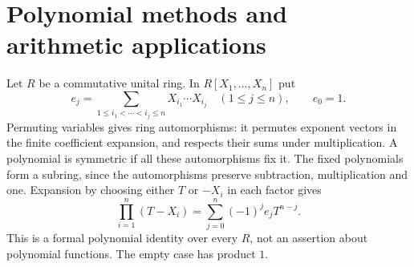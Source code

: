 \chapter{Polynomial methods and arithmetic applications}\label{chap:M07.19}

Let $R$ be a commutative unital ring. In $R[X_1,\ldots,X_n]$ put
\[
 e_j=\sum_{1\le i_1<\cdots<i_j\le n}X_{i_1}\cdots X_{i_j}
 \quad(1\le j\le n),\qquad e_0=1.
\]
Permuting variables gives ring automorphisms: it permutes exponent
vectors in the finite coefficient expansion, and respects their sums
under multiplication. A polynomial is symmetric if all these
automorphisms fix it. The fixed polynomials form a subring, since the
automorphisms preserve subtraction, multiplication and one.
Expansion by choosing either $T$ or $-X_i$ in each factor gives
\begin{equation}\label{eq:symmetric-vieta}
 \prod_{i=1}^n(T-X_i)=\sum_{j=0}^n(-1)^j e_jT^{n-j}.
\end{equation}
This is a formal polynomial identity over every $R$, not an assertion
about polynomial functions. The empty case has product $1$.

